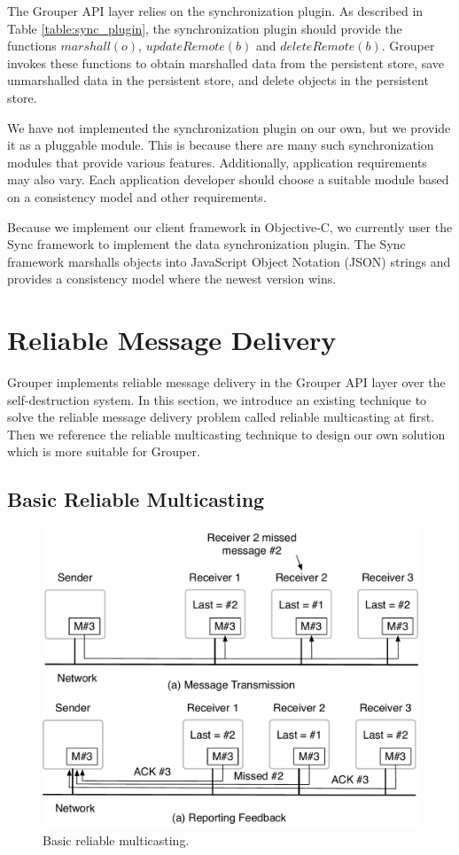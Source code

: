 \documentclass[a4paper,11pt]{report}
\begin{document}
The Grouper API layer relies on the synchronization plugin.
As described in Table \ref{table:sync_plugin}, the synchronization plugin should provide the functions $marshall(o)$, $updateRemote(b)$ and $deleteRemote(b)$.
Grouper invokes these functions to obtain marshalled data from the persistent store, save unmarshalled data in the persistent store, and delete objects in the persistent store.

We have not implemented the synchronization plugin on our own, but we provide it as a pluggable module.
This is because there are many such synchronization modules that provide various features.
Additionally, application requirements may also vary.
Each application developer should choose a suitable module based on a consistency model and other requirements.


Because we implement our client framework in Objective-C, we currently user the Sync framework\cite{sync} to implement the data synchronization plugin.
The Sync framework marshalls objects into JavaScript Object Notation (JSON) strings and provides a consistency model where the newest version wins.

\section{Reliable Message Delivery}  \label{section:reliable_message_delivery}

Grouper implements reliable message delivery in the Grouper API layer over the self-destruction system.
In this section, we introduce an existing technique to solve the reliable message delivery problem called reliable multicasting at first.
Then we reference the reliable multicasting technique to design our own solution which is more suitable for Grouper.

\subsection{Basic Reliable Multicasting}

\begin{figure}[t]
	\centering
	\includegraphics[scale=0.6]{reliable_multicasting}
	\caption{Basic reliable multicasting.}
	\label{fig:reliable_multicasting}
\end{figure}
\end{document}
